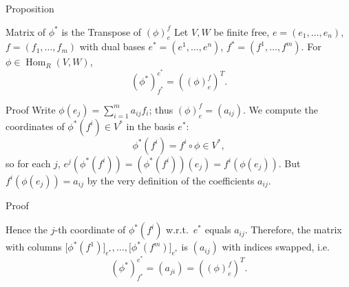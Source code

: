 \begin{frame}{Proposition}
\vspace{-0.2cm}
\begin{block}{Matrix of $\phi^*$ is the Transpose of $(\phi)_e^f$}
    Let $V,W$ be finite free, $e=(e_1,\dots,e_n)$, $f=(f_1,\dots,f_m)$ with dual bases $e^*=(e^1,\dots,e^n)$, $f^*=(f^1,\dots,f^m)$. For $\phi\in\operatorname{Hom}_R(V,W)$,
\[
(\phi^*)_{f^*}^{e^*} = \left((\phi)_e^f\right)^{\!T}.
\]
\end{block}
\vspace{-0.2cm}

\begin{block}{Proof}
Write $\phi(e_j)=\sum_{i=1}^m a_{ij} f_i$; thus $(\phi)_e^f=(a_{ij})$. We compute the coordinates of $\phi^*(f^i)\in V^*$ in the basis $e^*$:
\[
\phi^*(f^i)=f^i\circ \phi \in V^*,
\]
so for each $j$, $e^j\left(\phi^*(f^i)\right) = \left(\phi^*(f^i)\right)(e_j) = f^i(\phi(e_j)).$
But $f^i(\phi(e_j))=a_{ij}$ by the very definition of the coefficients $a_{ij}$.
\end{block}

\end{frame}

\begin{frame}{Proof}
\vspace{-0.3cm}
\begin{block}{}
 Hence the $j$-th coordinate of $\phi^*(f^i)$ w.r.t.\ $e^*$ equals $a_{ij}$. Therefore, the matrix with columns $\big[\phi^*(f^1)\big]_{e^*},\dots,\big[\phi^*(f^m)\big]_{e^*}$ is $(a_{ij})$ with indices swapped, i.e.
\[
(\phi^*)_{f^*}^{e^*}=(a_{ji})=\left((\phi)_e^f\right)^{\!T}.
\]
\end{block}
\vspace{-0.7cm}
\begin{center}
\end{center}

\end{frame}


